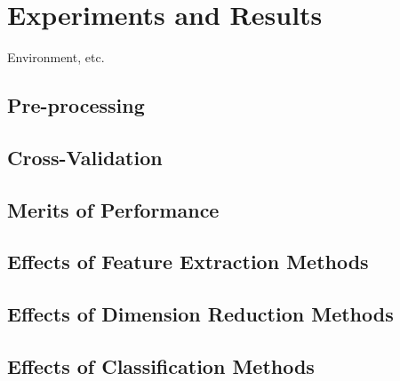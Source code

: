 \chapter{Experiments and Results}
\label{chap:experiments}

Environment, etc.

\section{Pre-processing}

\section{Cross-Validation}

\section{Merits of Performance}

\section{Effects of Feature Extraction Methods}

\section{Effects of Dimension Reduction Methods}

\section{Effects of Classification Methods}

